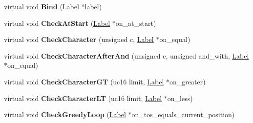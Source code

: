 \begin{DoxyCompactItemize}
\item 
virtual void {\bfseries Bind} (\hyperlink{classv8_1_1internal_1_1_label}{Label} $\ast$label)\hypertarget{classv8_1_1internal_1_1_reg_exp_macro_assembler_tracer_a821121162f9db6acc863097e0a9e0b1d}{}\label{classv8_1_1internal_1_1_reg_exp_macro_assembler_tracer_a821121162f9db6acc863097e0a9e0b1d}

\item 
virtual void {\bfseries Check\+At\+Start} (\hyperlink{classv8_1_1internal_1_1_label}{Label} $\ast$on\+\_\+at\+\_\+start)\hypertarget{classv8_1_1internal_1_1_reg_exp_macro_assembler_tracer_adb9ec7a6cd7a6584373bc6cd6818fba2}{}\label{classv8_1_1internal_1_1_reg_exp_macro_assembler_tracer_adb9ec7a6cd7a6584373bc6cd6818fba2}

\item 
virtual void {\bfseries Check\+Character} (unsigned c, \hyperlink{classv8_1_1internal_1_1_label}{Label} $\ast$on\+\_\+equal)\hypertarget{classv8_1_1internal_1_1_reg_exp_macro_assembler_tracer_a8a4e4a8666cb0b10028b63faa0faaeeb}{}\label{classv8_1_1internal_1_1_reg_exp_macro_assembler_tracer_a8a4e4a8666cb0b10028b63faa0faaeeb}

\item 
virtual void {\bfseries Check\+Character\+After\+And} (unsigned c, unsigned and\+\_\+with, \hyperlink{classv8_1_1internal_1_1_label}{Label} $\ast$on\+\_\+equal)\hypertarget{classv8_1_1internal_1_1_reg_exp_macro_assembler_tracer_a04cc89b123da0c49cb9d95f3bbd5f289}{}\label{classv8_1_1internal_1_1_reg_exp_macro_assembler_tracer_a04cc89b123da0c49cb9d95f3bbd5f289}

\item 
virtual void {\bfseries Check\+Character\+GT} (uc16 limit, \hyperlink{classv8_1_1internal_1_1_label}{Label} $\ast$on\+\_\+greater)\hypertarget{classv8_1_1internal_1_1_reg_exp_macro_assembler_tracer_a8a8e43fad9406f31c8e448488052cb67}{}\label{classv8_1_1internal_1_1_reg_exp_macro_assembler_tracer_a8a8e43fad9406f31c8e448488052cb67}

\item 
virtual void {\bfseries Check\+Character\+LT} (uc16 limit, \hyperlink{classv8_1_1internal_1_1_label}{Label} $\ast$on\+\_\+less)\hypertarget{classv8_1_1internal_1_1_reg_exp_macro_assembler_tracer_a620a639bfd9bf374cfe220b7212b1ed1}{}\label{classv8_1_1internal_1_1_reg_exp_macro_assembler_tracer_a620a639bfd9bf374cfe220b7212b1ed1}

\item 
virtual void {\bfseries Check\+Greedy\+Loop} (\hyperlink{classv8_1_1internal_1_1_label}{Label} $\ast$on\+\_\+tos\+\_\+equals\+\_\+current\+\_\+position)\hypertarget{classv8_1_1internal_1_1_reg_exp_macro_assembler_tracer_ac1ec31d01d10004d512681e28bee4e55}{}\label{classv8_1_1internal_1_1_reg_exp_macro_assembler_tracer_ac1ec31d01d10004d512681e28bee4e55}


\end{DoxyCompactItemize}
